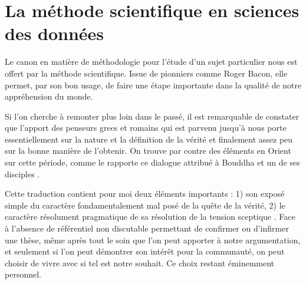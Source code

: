 \chapter{ \nmu La méthode scientifique en sciences des données} \label{chap:methode}


Le canon en matière de méthodologie pour l'étude d'un sujet particulier nous est offert par la méthode scientifique. Issue de pionniers comme Roger Bacon\cite{bacon1878novum}, elle permet, par son bon usage, de faire une étape importante dans la qualité de notre appréhension du monde.

Si l'on cherche à remonter plus loin dans le passé, il est remarquable de constater que l'apport des penseurs grecs et romains qui est parvenu jusqu'à nous porte essentiellement sur la nature et la définition de la vérité et finalement assez peu sur la bonne manière de l’obtenir. On trouve par contre des éléments en Orient sur cette période, comme le rapporte ce dialogue attribué à Bouddha et un de ses disciples .

Cette traduction contient pour moi deux éléments importants : 1) son exposé simple du caractère fondamentalement mal posé de la quête de la vérité, 2) le caractère résolument pragmatique de sa résolution de la \og tension sceptique \fg. Face à l'absence de référentiel non discutable permettant de confirmer ou d'infirmer une thèse, même après tout le soin que l'on peut apporter à notre argumentation, et seulement si l'on peut démontrer son intérêt pour la communauté, on peut choisir de vivre avec si tel est notre souhait. Ce choix restant éminemment personnel.

